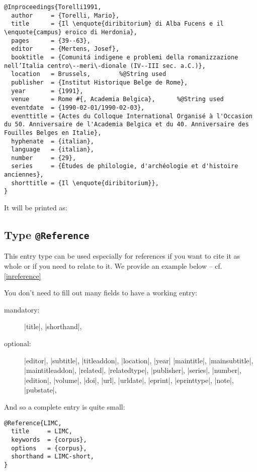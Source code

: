 \documentclass[a4paper,
10pt,
greek,
french,
spanish,
italian,
ngerman,
english
]{ltxdoc}
\begin{document}
 
 
 \begin{lstlisting}[style=bibentry,label=Torelli1991,caption={{@}Inproceedings\{Torelli1991,…\} }]
@Inproceedings{Torelli1991,
  author     = {Torelli, Mario},
  title      = {Il \enquote{diribitorium} di Alba Fucens e il \enquote{campus} eroico di Herdonia},
  pages      = {39--63},
  editor     = {Mertens, Josef},
  booktitle  = {Comunitá indigene e problemi della romanizzazione nell’Italia centro\--meri\-dionale (IV--III sec. a.C.)},
  location   = Brussels, 		%@String used
  publisher  = {Institut Historique Belge de Rome},
  year       = {1991},
  venue      = Rome #{, Academia Belgica},		%@String used
  eventdate  = {1990-02-01/1990-02-03},
  eventtitle = {Actes du Colloque International Organisé à l'Occasion du 50. Anniversaire de l'Academia Belgica et du 40. Anniversaire des Fouilles Belges en Italie},
  hyphenate  = {italian},
  language   = {italian},
  number     = {29},
  series     = {Études de philologie, d'archéologie et d'histoire anciennes},
  shorttitle = {Il \enquote{diribitorium}},
}
\end{lstlisting}
It will be printed as:
 

 \subsection{Type \texttt{@Reference}}\label{reference}
 This entry type can be used especially for references if you want to cite it as whole or if you need to relate to it. 
We provide an example below -- cf. \cref{inreference}

You don’t need to fill out many fields to have a working entry:
\begin{description}
\item[mandatory:] |title|, |shorthand|,
\item[optional:] 
 |editor|, |subtitle|, |titleaddon|,
 |location|, |year|
|maintitle|, |mainsubtitle|, |maintitleaddon|,
|related|, |relatedtype|,
|publisher|, |series|, |number|, |edition|, |volume|,
|doi|, |url|, |urldate|, |eprint|, |eprinttype|, |note|, |pubstate|, 
\end{description}

And so a complete entry is quite small:
\begin{lstlisting}[style=bibentry,label=LIMC,caption={{@}Reference\{LIMC,…\} }]
@Reference{LIMC,
  title     = LIMC,
  keywords  = {corpus},
  options   = {corpus},
  shorthand = LIMC-short,
}
\end{lstlisting}
 
\end{document}

